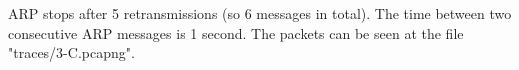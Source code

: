 ARP stops after 5 retransmissions (so 6 messages in total). The time between two consecutive ARP messages is 1 second.
The packets can be seen at the file "traces/3-C.pcapng".